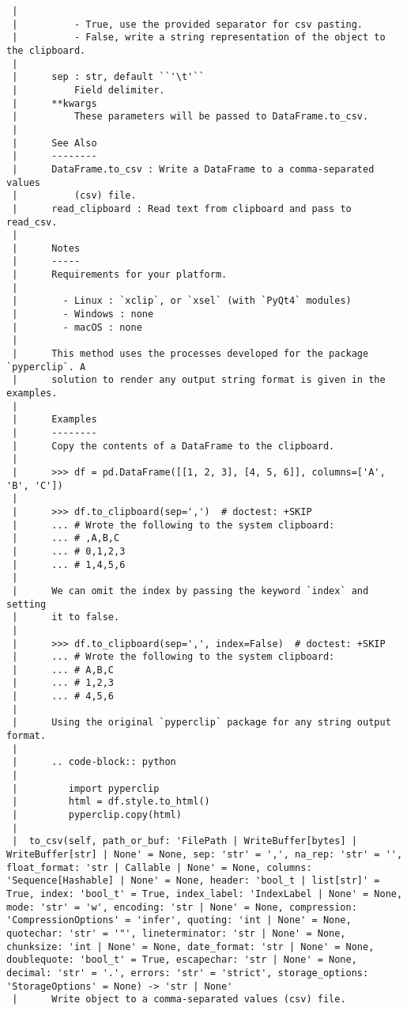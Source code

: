 \documentclass[
  letterpaper,
  DIV=11,
  numbers=noendperiod]{scrreprt}
\begin{document}
\begin{verbatim}
 |      
 |          - True, use the provided separator for csv pasting.
 |          - False, write a string representation of the object to the clipboard.
 |      
 |      sep : str, default ``'\t'``
 |          Field delimiter.
 |      **kwargs
 |          These parameters will be passed to DataFrame.to_csv.
 |      
 |      See Also
 |      --------
 |      DataFrame.to_csv : Write a DataFrame to a comma-separated values
 |          (csv) file.
 |      read_clipboard : Read text from clipboard and pass to read_csv.
 |      
 |      Notes
 |      -----
 |      Requirements for your platform.
 |      
 |        - Linux : `xclip`, or `xsel` (with `PyQt4` modules)
 |        - Windows : none
 |        - macOS : none
 |      
 |      This method uses the processes developed for the package `pyperclip`. A
 |      solution to render any output string format is given in the examples.
 |      
 |      Examples
 |      --------
 |      Copy the contents of a DataFrame to the clipboard.
 |      
 |      >>> df = pd.DataFrame([[1, 2, 3], [4, 5, 6]], columns=['A', 'B', 'C'])
 |      
 |      >>> df.to_clipboard(sep=',')  # doctest: +SKIP
 |      ... # Wrote the following to the system clipboard:
 |      ... # ,A,B,C
 |      ... # 0,1,2,3
 |      ... # 1,4,5,6
 |      
 |      We can omit the index by passing the keyword `index` and setting
 |      it to false.
 |      
 |      >>> df.to_clipboard(sep=',', index=False)  # doctest: +SKIP
 |      ... # Wrote the following to the system clipboard:
 |      ... # A,B,C
 |      ... # 1,2,3
 |      ... # 4,5,6
 |      
 |      Using the original `pyperclip` package for any string output format.
 |      
 |      .. code-block:: python
 |      
 |         import pyperclip
 |         html = df.style.to_html()
 |         pyperclip.copy(html)
 |  
 |  to_csv(self, path_or_buf: 'FilePath | WriteBuffer[bytes] | WriteBuffer[str] | None' = None, sep: 'str' = ',', na_rep: 'str' = '', float_format: 'str | Callable | None' = None, columns: 'Sequence[Hashable] | None' = None, header: 'bool_t | list[str]' = True, index: 'bool_t' = True, index_label: 'IndexLabel | None' = None, mode: 'str' = 'w', encoding: 'str | None' = None, compression: 'CompressionOptions' = 'infer', quoting: 'int | None' = None, quotechar: 'str' = '"', lineterminator: 'str | None' = None, chunksize: 'int | None' = None, date_format: 'str | None' = None, doublequote: 'bool_t' = True, escapechar: 'str | None' = None, decimal: 'str' = '.', errors: 'str' = 'strict', storage_options: 'StorageOptions' = None) -> 'str | None'
 |      Write object to a comma-separated values (csv) file.

\end{verbatim}
\end{document}
